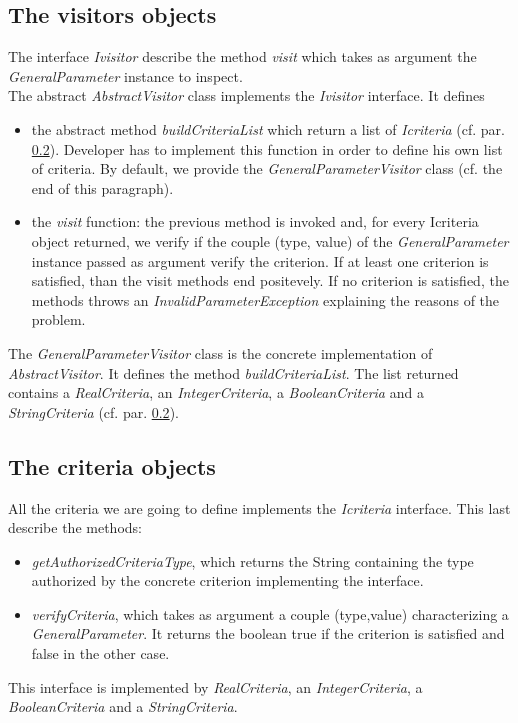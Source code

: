 \documentclass[a4paper,11pt] {ivoa}
\begin{document}
\subsection{The visitors objects}
The interface {\it Ivisitor} describe the method {\it visit} which takes as argument the {\it GeneralParameter} instance to inspect.\\
The abstract {\it AbstractVisitor} class implements the {\it Ivisitor} interface. It defines 
\begin{itemize}
\item the abstract method {\it buildCriteriaList} which return a list of {\it Icriteria} (cf. par. \ref{criteria}). Developer has to implement this function in order to define his own list of criteria. By default, we provide the {\it GeneralParameterVisitor} class (cf. the end of this paragraph).
\item the {\it visit} function: the previous method is invoked and, for every {Icriteria} object returned, we verify if the couple (type, value) of the {\it GeneralParameter} instance passed as argument verify the criterion. If at least one criterion is satisfied, than the visit methods end positevely. If no criterion is satisfied, the methods throws an {\it InvalidParameterException} explaining the reasons of the problem.
\end{itemize}
The {\it GeneralParameterVisitor} class is the concrete implementation of {\it AbstractVisitor}. It defines the method {\it buildCriteriaList}. The list returned contains a {\it RealCriteria}, an {\it IntegerCriteria}, a {\it BooleanCriteria} and a {\it StringCriteria} (cf. par. \ref{criteria}).  

\subsection{The criteria objects}\label{criteria}
All the criteria we are going to define implements the {\it Icriteria} interface. This last describe the methods:
\begin{itemize}
\item {\it getAuthorizedCriteriaType}, which returns the String containing the type authorized by the concrete criterion implementing the interface.
\item {\it verifyCriteria}, which takes as argument a couple (type,value) characterizing a {\it GeneralParameter}. It returns the boolean true if the criterion is satisfied and false in the other case.
\end{itemize}
This interface is implemented by {\it RealCriteria}, an {\it IntegerCriteria}, a {\it BooleanCriteria} and a {\it StringCriteria}.
\end{document}
